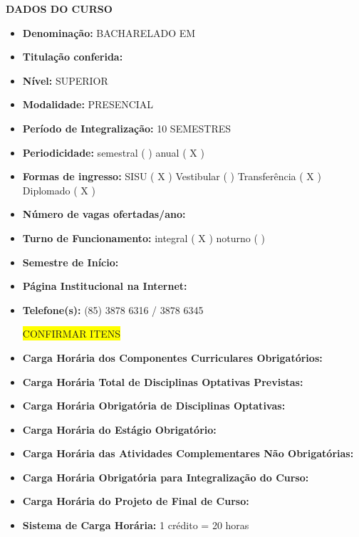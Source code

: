 \clearpage
\thispagestyle{empty}
\begin{center}
	\textbf{DADOS DO CURSO}
\end{center}

\vspace{0.5cm}

\begin{itemize}
	\item \textbf{Denominação:} \MakeUppercase{Bacharelado em \NOMEENG}
	\item \textbf{Titulação conferida:} \MakeUppercase{\NOMEEGRESSO}
	\item \textbf{Nível:} \MakeUppercase{SUPERIOR}
	\item \textbf{Modalidade:} \MakeUppercase{PRESENCIAL}
	\item \textbf{Período de Integralização:} \MakeUppercase{10 semestres}
	\item \textbf{Periodicidade: }{semestral (  )  anual ( X ) }
	\item \textbf{Formas de ingresso: }{SISU ( X )  Vestibular (  ) Transferência ( X ) Diplomado ( X ) }
	\item \textbf{Número de vagas ofertadas/ano: }{\NUMVAGAS}
	\item \textbf{Turno de Funcionamento: }{integral ( X ) noturno ( )}
	\item \textbf{Semestre de Início:} \MakeUppercase{\SEMESTRE}
	\item\textbf{Página Institucional na Internet:} 
	
	\web{\PAGINA}
	\item\textbf{Telefone(s):} (85) 3878 6316 / 3878 6345
	
	\colorbox{yellow}{CONFIRMAR ITENS}
	
	\item \textbf{Carga Horária dos Componentes Curriculares Obrigatórios: }{\CHTOTALDOB}
	\item \textbf{Carga Horária Total de Disciplinas Optativas Previstas: }{\CHOPT}
	\item \textbf{Carga Horária Obrigatória de Disciplinas Optativas: }{\CHOPTMIN}
	\item \textbf{Carga Horária do Estágio Obrigatório: }{\CHESTAGIO}
	\item \textbf{Carga Horária das Atividades Complementares Não Obrigatórias: }{\CHCOMP}
	\item \textbf{Carga Horária Obrigatória para Integralização do Curso: }{\CHTOTALOB}
	\item \textbf{Carga Horária do Projeto de Final de Curso: }{\CHPFC}
	\item \textbf{Sistema de Carga Horária: }{1 crédito = 20 horas}
\end{itemize}
